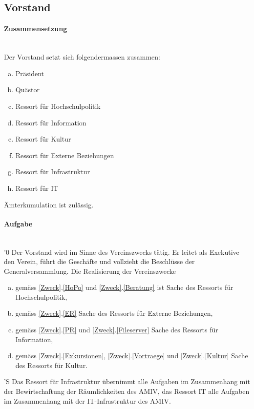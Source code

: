 \documentclass[a4paper,11pt]{article}
\begin{document}
\subsection{Vorstand}
\paragraph{Zusammensetzung} \ \\
Der Vorstand setzt sich folgendermassen zusammen:
\begin{enumerate}[(a)]
  \item Präsident
  \item Quästor
  \item Ressort für Hochschulpolitik
  \item Ressort für Information
  \item Ressort für Kultur
  \item Ressort für Externe Beziehungen
  \item Ressort für Infrastruktur
  \item Ressort für IT
\end{enumerate}
Ämterkumulation ist zulässig.


\paragraph{Aufgabe} \ \\
'0 Der Vorstand wird im Sinne des Vereinszwecks tätig. Er leitet als Exekutive den Verein, führt die Geschäfte und vollzieht die Beschlüsse der Generalversammlung. Die Realisierung der Vereinszwecke
\begin{enumerate}[(a)]
  \item gemäss \ref{Zweck}.\ref{HoPo} und \ref{Zweck}.\ref{Beratung} ist Sache des Ressorts für Hochschulpolitik,
  \item gemäss \ref{Zweck}.\ref{ER} Sache des Ressorts für Externe Beziehungen,
  \item gemäss \ref{Zweck}.\ref{PR} und \ref{Zweck}.\ref{Fileserver} Sache des Ressorts für Information,
  \item gemäss \ref{Zweck}.\ref{Exkursionen}, \ref{Zweck}.\ref{Vortraege} und \ref{Zweck}.\ref{Kultur} Sache des Ressorts für Kultur. %
\end{enumerate}
'S Das Ressort für Infrastruktur übernimmt alle Aufgaben im Zusammenhang mit der Bewirtschaftung der Räumlichkeiten des AMIV, das Ressort IT alle Aufgaben im Zusammenhang mit der IT-Infrastruktur des AMIV.
\end{document}
